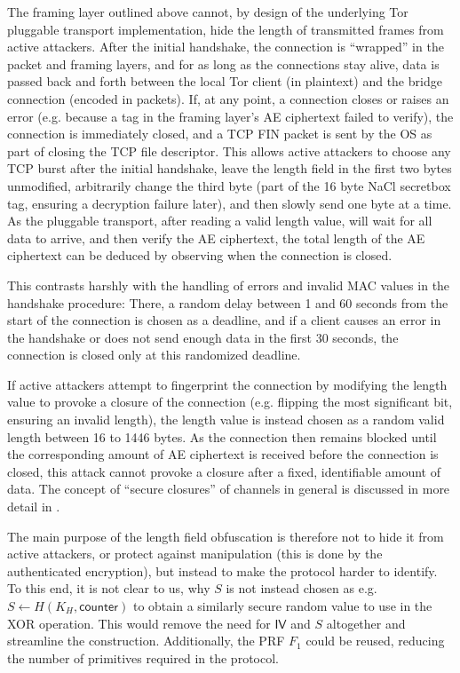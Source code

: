 The framing layer outlined above cannot, by design of the underlying Tor pluggable transport implementation, hide the length of transmitted frames from active attackers.
After the initial handshake, the connection is ``wrapped'' in the packet and framing layers, and for as long as the connections stay alive, data is passed back and forth between the local Tor client (in plaintext) and the bridge connection (encoded in packets).
If, at any point, a connection closes or raises an error (e.g. because a tag in the framing layer's AE ciphertext failed to verify), the connection is immediately closed, and a TCP FIN packet is sent by the OS as part of closing the TCP file descriptor.
This allows active attackers to choose any TCP burst after the initial handshake, leave the length field in the first two bytes unmodified, arbitrarily change the third byte (part of the 16 byte NaCl secretbox tag, ensuring a decryption failure later), and then slowly send one byte at a time. As the pluggable transport, after reading a valid length value, will wait for all data to arrive, and then verify the AE ciphertext, the total length of the AE ciphertext can be deduced by observing when the connection is closed.

This contrasts harshly with the handling of errors and invalid MAC values in the handshake procedure: There, a random delay between 1 and 60 seconds from the start of the connection is chosen as a deadline, and if a client causes an error in the handshake or does not send enough data in the first 30 seconds, the connection is closed only at this randomized deadline.

If active attackers attempt to fingerprint the connection by modifying the length value to provoke a closure of the connection (e.g. flipping the most significant bit, ensuring an invalid length), the length value is instead chosen as a random valid length between 16 to 1446 bytes. As the connection then remains blocked until the corresponding amount of AE ciphertext is received before the connection is closed, this attack cannot provoke a closure after a fixed, identifiable amount of data. The concept of ``secure closures'' of channels in general is discussed in more detail in \cite{CCS:FenJoh24}.

The main purpose of the length field obfuscation is therefore not to hide it from active attackers, or protect against manipulation (this is done by the authenticated encryption), but instead to make the protocol harder to identify. To this end, it is not clear to us, why $S$ is not instead chosen as e.g.~$S \gets H(K_H, \mathsf{counter})$ to obtain a similarly secure random value to use in the XOR operation. This would remove the need for $\mathsf{IV}$ and $S$ altogether and streamline the construction. Additionally, the \drivel{} PRF $F_1$ could be reused, reducing the number of primitives required in the protocol.

